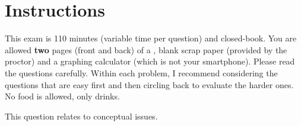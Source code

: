 \documentclass[12pt]{article}
\begin{document}
\section*{Instructions}
This exam is 110 minutes (variable time per question) and closed-book. You are allowed \textbf{two} pages (front and back) of a , blank scrap paper (provided by the proctor) and a graphing calculator (which is not your smartphone). Please read the questions carefully. Within each problem, I recommend considering the questions that are easy first and then circling back to evaluate the harder ones. No food is allowed, only drinks. %

\pagebreak

\problem This question relates to conceptual issues.
\end{document}

